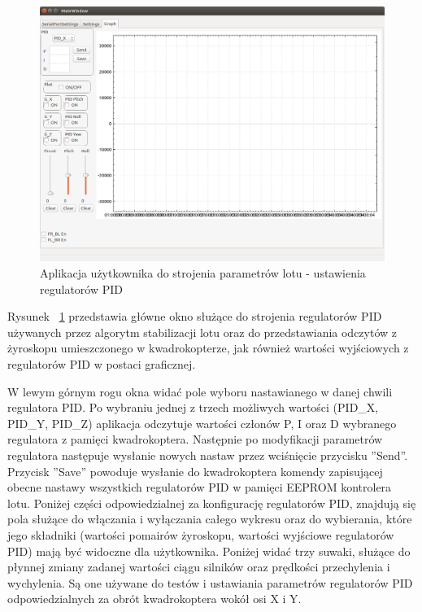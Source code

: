 \begin{figure}[H]
	\centering
	\includegraphics[scale=0.4]{Pictures/QuadroTune/QuadroTuneGraph.png}
	\caption[Aplikacja użytkownika do strojenia parametrów lotu - ustawienia regulatorów PID]{Aplikacja użytkownika do strojenia parametrów lotu - ustawienia regulatorów PID}
	\label{fig:QuadroTune_screen3}
\end{figure}

Rysunek ~\ref{fig:QuadroTune_screen3} przedstawia główne okno służące do strojenia regulatorów PID używanych przez algorytm stabilizacji lotu oraz do przedstawiania odczytów z żyroskopu umieszczonego w kwadrokopterze, jak również wartości wyjściowych z regulatorów PID w postaci graficznej.

W lewym górnym rogu okna widać pole wyboru nastawianego w danej chwili regulatora PID. Po wybraniu jednej z trzech możliwych wartości (PID\_X, PID\_Y, PID\_Z) aplikacja odczytuje wartości członów P, I oraz D wybranego regulatora z pamięci kwadrokoptera. Następnie po modyfikacji parametrów regulatora następuje wysłanie nowych nastaw przez wciśnięcie przycisku ''Send''. Przycisk ''Save'' powoduje wysłanie do kwadrokoptera komendy zapisującej obecne nastawy wszystkich regulatorów PID w pamięci EEPROM kontrolera lotu. Poniżej części odpowiedzialnej za konfigurację regulatorów PID, znajdują się pola służące do włączania i wyłączania całego wykresu oraz do wybierania, które jego składniki (wartości pomairów żyroskopu, wartości wyjściowe regulatorów PID) mają być widoczne dla użytkownika. Poniżej widać trzy suwaki, służące do płynnej zmiany zadanej wartości ciągu silników oraz prędkości przechylenia i wychylenia. Są one używane do testów i ustawiania parametrów regulatorów PID odpowiedzialnych za obrót kwadrokoptera wokół osi X i Y. 


